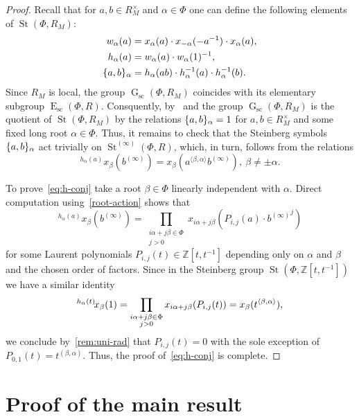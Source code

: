 \documentclass[oneside, 11pt]{amsart}
\numberwithin{equation}{section}
\theoremstyle{definition}
\theoremstyle{remark}
\DeclareMathOperator\St{St}
\DeclareMathOperator\GG{G}
\DeclareMathOperator\E{E}
\newcommand{\up}[2]{{^{#1}\!{#2}}}
\begin{document}
\begin{proof}
 Recall that for \(a, b \in R_M^\times\) and \(\alpha \in \Phi\) one can define the following elements of $\St(\Phi, R_M)$: 
  \begin{align*} w_\alpha(a) & =  x_\alpha(a) \cdot x_{-\alpha}(-a^{-1}) \cdot x_\alpha(a), \\
                 h_\alpha(a) & =  w_\alpha(a) \cdot w_\alpha(1)^{-1}, \\
                 \{ a,\-b \}_\alpha & = h_\alpha(ab) \cdot h_\alpha^{-1}(a) \cdot h_\alpha^{-1}(b). \end{align*}
 Since $R_M$ is local, the group $\GG_{\mathrm{sc}}(\Phi, R_M)$ coincides with its elementary subgroup $\E_{\mathrm{sc}}(\Phi, R)$.
 Consquently, by~\cite[Proposition~1.6]{Abe69} and \cite[Theorem~2.13]{Ste73} the group \(\GG_{\mathrm{sc}}(\Phi, R_M)\) is the quotient of \(\St(\Phi, R_M)\) by the relations $\{a,\-b\}_\alpha = 1$ for \(a, b \in R_M^\times\) and some fixed long root $\alpha\in\Phi$. Thus, it remains to check that the Steinberg symbols $\{a,\-b\}_\alpha$ act trivially on \(\St^{(\infty)}(\Phi, R)\), which, in turn, follows from the relations
 \begin{equation}\label{eq:h-conj} \up{h_\alpha(a)}x_\beta(b^{(\infty)}) = x_\beta(a^{\langle \beta, \alpha \rangle}b^{(\infty)}),\ \beta\neq\pm\alpha. \end{equation}
 
To prove~\eqref{eq:h-conj} take a root \(\beta \in \Phi\) linearly independent with \(\alpha\).
 Direct computation using~\cref{root-action} shows that
 \[\up{h_\alpha(a)}{x_\beta(b^{(\infty)})} = \prod_{\substack{i\alpha + j\beta \in \Phi\\ j > 0}} x_{i\alpha + j\beta}(P_{i, j}(a) \cdot {b^{(\infty)}}^j)\]
 for some Laurent polynomials \(P_{i, j}(t) \in \mathbb Z[t, t^{-1}]\) depending only on \(\alpha\) and \(\beta\) and the chosen order of factors. Since in the Steinberg group \(\St(\Phi, \mathbb Z[t, t^{-1}])\) we have a similar identity
 \[\up{h_\alpha(t)}{x_\beta(1)} = \prod_{\substack{i\alpha + j\beta \in \Phi\\ j > 0}} x_{i\alpha + j\beta}(P_{i, j}(t)) = x_{\beta}(t^{\langle \beta,\-\alpha \rangle}),\]
 we conclude by~\cref{rem:uni-rad} that \(P_{i, j}(t) = 0\) with the sole exception of \(P_{0, 1}(t) = t^{(\beta, \alpha)}\). Thus, the proof of~\eqref{eq:h-conj} is complete.
\end{proof}

\section{Proof of the main result} \label{sec:proof-main}
\end{document}
